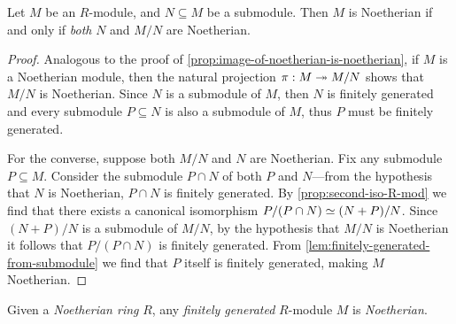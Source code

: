 \begin{proposition}
    \label{prop:noetherian-from-submodule}
    Let \(M\) be an \(R\)-module, and \(N \subseteq M\) be a submodule. Then \(M\)
    is Noetherian if and only if \emph{both} \(N\) and \(M/N\) are Noetherian.
\end{proposition}

\begin{proof}
    Analogous to the proof of \cref{prop:image-of-noetherian-is-noetherian}, if
    \(M\) is a Noetherian module, then the natural projection \(\pi: M \twoheadrightarrow M/N\)
    shows that \(M/N\) is Noetherian. Since \(N\) is a submodule of \(M\), then
    \(N\) is finitely generated and every submodule \(P \subseteq N\) is also a
    submodule of \(M\), thus \(P\) must be finitely generated.

    For the converse, suppose both \(M/N\) and \(N\) are Noetherian. Fix any
    submodule \(P \subseteq M\). Consider the submodule \(P \cap N\) of both \(P\)
    and \(N\)---from the hypothesis that \(N\) is Noetherian, \(P \cap N\) is
    finitely generated. By \cref{prop:second-iso-R-mod} we find that there exists a
    canonical isomorphism \(P/(P \cap N) \simeq (N + P)/N\). Since
    \((N + P)/N\) is a submodule of \(M/N\), by the hypothesis that \(M/N\) is
    Noetherian it follows that \(P/(P \cap N)\) is finitely generated. From
    \cref{lem:finitely-generated-from-submodule} we find that \(P\) itself is
    finitely generated, making \(M\) Noetherian.
\end{proof}

\begin{corollary}
    \label{cor:noetherian-ring-fg-module-is-noetherian}
    Given a \emph{Noetherian ring} \(R\), any \emph{finitely generated} \(R\)-module
    \(M\) is \emph{Noetherian}.
\end{corollary}

